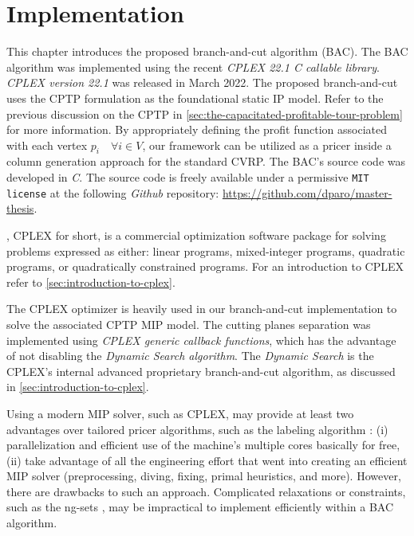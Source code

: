 \chapter{Implementation}
\label{sec:implementation-chapter}

This chapter introduces the proposed branch-and-cut algorithm (BAC).
The BAC algorithm was implemented using the recent \textit{CPLEX 22.1 C callable library}.
\textit{CPLEX version 22.1} was released in March 2022.
The proposed branch-and-cut uses the CPTP formulation as the foundational static IP model.
Refer to the previous discussion on the CPTP in \cref{sec:the-capacitated-profitable-tour-problem} for more information.
By appropriately defining the profit function associated with each vertex $p_i \quad \forall i \in V$,
our framework can be utilized as a pricer inside a column generation approach for the standard CVRP.
The BAC's source code was developed in \textit{C}.
The source code is freely available under a permissive \texttt{MIT license}
at the following \textit{Github} repository: \url{https://github.com/dparo/master-thesis}.

\medskip

,
CPLEX for short,
is a commercial optimization software package for solving problems expressed as either:
linear programs, mixed-integer programs, quadratic programs, or quadratically constrained programs.
For an introduction to CPLEX refer to \cref{sec:introduction-to-cplex}.

The CPLEX optimizer is heavily used in our branch-and-cut implementation
to solve the associated CPTP MIP model.
The cutting planes separation was implemented using \textit{CPLEX generic callback functions},
which has the advantage of not disabling the \textit{Dynamic Search algorithm}.
The \textit{Dynamic Search} is the CPLEX's internal advanced proprietary branch-and-cut algorithm,
as discussed in \cref{sec:introduction-to-cplex}.

Using a modern MIP solver, such as CPLEX, may provide at least two advantages
over tailored pricer algorithms, such as the labeling algorithm \parencite{desrochers1992, feillet2004}:
(i) parallelization and efficient use of the machine's multiple cores basically for free,
(ii) take advantage of all the engineering effort that went into creating an efficient MIP solver
(preprocessing, diving, fixing, primal heuristics, and more).
However, there are drawbacks to such an approach.
Complicated relaxations or constraints, such as the ng-sets \parencite{baldacci2011},
may be impractical to implement efficiently within a BAC algorithm.

